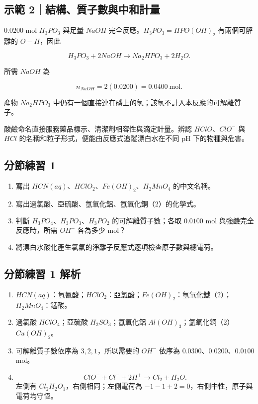 \documentclass[11pt,a4paper]{article}
\providecommand{\tightlist}{%
  \setlength{\itemsep}{0pt}\setlength{\parskip}{0pt}}
\begin{document}
\begin{HandoutWorkedExample}

\subsection{示範 2｜結構、質子數與中和計量}\label{ux793aux7bc4-2ux7d50ux69cbux8ceaux5b50ux6578ux8207ux4e2dux548cux8a08ux91cf}

\(0.0200\) mol \(H_3PO_3\) 與足量 \(NaOH\) 完全反應。\(H_3PO_3=HPO(OH)_2\) 有兩個可解離的 \(O-H\)，因此

\[
H_3PO_3+2NaOH\rightarrow Na_2HPO_3+2H_2O.
\]

所需 \(NaOH\) 為

\[
n_{NaOH}=2(0.0200)=0.0400\ \mathrm{mol}.
\]

產物 \(Na_2HPO_3\) 中仍有一個直接連在磷上的氫；該氫不計入本反應的可解離質子。

\end{HandoutWorkedExample}

酸鹼命名直接服務藥品標示、清潔劑相容性與滴定計量。辨認 \(HClO\)、\(ClO^-\) 與 \(HCl\) 的名稱和粒子形式，便能由反應式追蹤漂白水在不同 pH 下的物種與危害。

\subsection{分節練習 1}\label{ux5206ux7bc0ux7df4ux7fd2-1}

\begin{enumerate}
\def\labelenumi{\arabic{enumi}.}
\tightlist
\item
  寫出 \(HCN(aq)\)、\(HClO_2\)、\(Fe(OH)_2\)、\(H_2MnO_4\) 的中文名稱。
\item
  寫出過氯酸、亞硫酸、氫氧化鋁、氫氧化銅（2）的化學式。
\item
  判斷 \(H_3PO_4\)、\(H_3PO_3\)、\(H_3PO_2\) 的可解離質子數；各取 \(0.0100\) mol 與強鹼完全反應時，所需 \(OH^-\) 各為多少 mol？
\item
  將漂白水酸化產生氯氣的淨離子反應式逐項檢查原子數與總電荷。
\end{enumerate}

\subsection{分節練習 1 解析}\label{ux5206ux7bc0ux7df4ux7fd2-1-ux89e3ux6790}

\begin{enumerate}
\def\labelenumi{\arabic{enumi}.}
\tightlist
\item
  \(HCN(aq)\)：氫氰酸；\(HClO_2\)：亞氯酸；\(Fe(OH)_2\)：氫氧化鐵（2）；\(H_2MnO_4\)：錳酸。
\item
  過氯酸 \(HClO_4\)；亞硫酸 \(H_2SO_3\)；氫氧化鋁 \(Al(OH)_3\)；氫氧化銅（2）\(Cu(OH)_2\)。
\item
  可解離質子數依序為 \(3,2,1\)，所以需要的 \(OH^-\) 依序為 \(0.0300\)、\(0.0200\)、\(0.0100\) mol。
\item
  \[
  ClO^-+Cl^-+2H^+\rightarrow Cl_2+H_2O.
  \]
  左側有 \(Cl_2H_2O_1\)，右側相同；左側電荷為 \(-1-1+2=0\)，右側中性，原子與電荷均守恆。
\end{enumerate}
\end{document}
